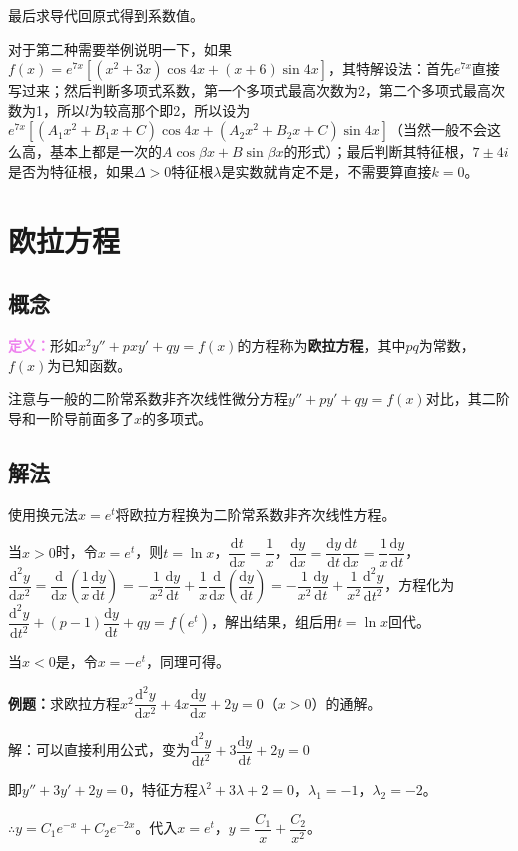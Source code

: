 \documentclass[UTF8, 12pt]{ctexart}
\begin{document}
最后求导代回原式得到系数值。

对于第二种需要举例说明一下，如果$f(x)=e^{7x}[(x^2+3x)\cos4x+(x+6)\sin4x]$，其特解设法：首先$e^{7x}$直接写过来；然后判断多项式系数，第一个多项式最高次数为2，第二个多项式最高次数为1，所以$l$为较高那个即2，所以设为$e^{7x}[(A_1x^2+B_1x+C)\cos4x+(A_2x^2+B_2x+C)\sin4x]$（当然一般不会这么高，基本上都是一次的$A\cos\beta x+B\sin\beta x$的形式）；最后判断其特征根，$7\pm4i$是否为特征根，如果$\Delta>0$特征根$\lambda$是实数就肯定不是，不需要算直接$k=0$。

\section{欧拉方程}

\subsection{概念}

\textcolor{violet}{\textbf{定义：}}形如$x^2y''+pxy'+qy=f(x)$的方程称为\textbf{欧拉方程}，其中$pq$为常数，$f(x)$为已知函数。

注意与一般的二阶常系数非齐次线性微分方程$y''+py'+qy=f(x)$对比，其二阶导和一阶导前面多了$x$的多项式。


\subsection{解法}

使用换元法$x=e^t$将欧拉方程换为二阶常系数非齐次线性方程。

当$x>0$时，令$x=e^t$，则$t=\ln x$，$\dfrac{\textrm{d}t}{\textrm{d}x}=\dfrac{1}{x}$，$\dfrac{\textrm{d}y}{\textrm{d}x}=\dfrac{\textrm{d}y}{\textrm{d}t}\dfrac{\textrm{d}t}{\textrm{d}x}=\dfrac{1}{x}\dfrac{\textrm{d}y}{\textrm{d}t}$，$\dfrac{\textrm{d}^2y}{\textrm{d}x^2}=\dfrac{\textrm{d}}{\textrm{d}x}\left(\dfrac{1}{x}\dfrac{\textrm{d}y}{\textrm{d}t}\right)=-\dfrac{1}{x^2}\dfrac{\textrm{d}y}{\textrm{d}t}+\dfrac{1}{x}\dfrac{\textrm{d}}{\textrm{d}x}\left(\dfrac{\textrm{d}y}{\textrm{d}t}\right)=-\dfrac{1}{x^2}\dfrac{\textrm{d}y}{\textrm{d}t}+\dfrac{1}{x^2}\dfrac{\textrm{d}^2y}{\textrm{d}t^2}$，方程化为$\dfrac{\textrm{d}^2y}{\textrm{d}t^2}+(p-1)\dfrac{\textrm{d}y}{\textrm{d}t}+qy=f(e^t)$，解出结果，组后用$t=\ln x$回代。

当$x<0$是，令$x=-e^t$，同理可得。

\textbf{例题：}求欧拉方程$x^2\dfrac{\textrm{d}^2y}{\textrm{d}x^2}+4x\dfrac{\textrm{d}y}{\textrm{d}x}+2y=0$（$x>0$）的通解。

解：可以直接利用公式，变为$\dfrac{\textrm{d}^2y}{\textrm{d}t^2}+3\dfrac{\textrm{d}y}{\textrm{d}t}+2y=0$

即$y''+3y'+2y=0$，特征方程$\lambda^2+3\lambda+2=0$，$\lambda_1=-1$，$\lambda_2=-2$。

$\therefore y=C_1e^{-x}+C_2e^{-2x}$。代入$x=e^t$，$y=\dfrac{C_1}{x}+\dfrac{C_2}{x^2}$。
\end{document}
